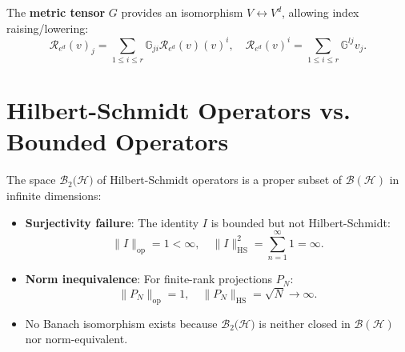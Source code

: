 \documentclass[aps,preprint]{revtex4}
\begin{document}
The \textbf{metric tensor} $G$ provides an isomorphism $V\leftrightarrow
V^{d}$, allowing index raising/lowering: 
\begin{equation*}
\mathcal{R}_{e^{d}}\left( v\right) _{j}=\sum_{1\leq i\leq r}\mathbb{G}_{ji}%
\mathcal{R}_{e^{d}}\left( v\right) \left( v\right) ^{i},\quad \mathcal{R}%
_{e^{d}}\left( v\right) ^{i}=\sum_{1\leq i\leq r}\mathbb{G}^{lj}v_{j}.
\end{equation*}

\section{Hilbert-Schmidt Operators vs. Bounded Operators }

The space $\mathcal{B}_{2}\mathcal{(H})$ of Hilbert-Schmidt operators is a
proper subset of $\mathcal{B}(\mathcal{H})$ in infinite dimensions:

\begin{itemize}
\item \textbf{Surjectivity failure}: The identity $I $ is bounded but not
Hilbert-Schmidt: 
\begin{equation*}
\|I\|_{\text{op}} = 1 < \infty, \quad \|I\|_{\text{HS}}^2 =
\sum_{n=1}^\infty 1 = \infty.
\end{equation*}

\item \textbf{Norm inequivalence}: For finite-rank projections $P_N $: 
\begin{equation*}
\|P_N\|_{\text{op}} = 1, \quad \|P_N\|_{\text{HS}} = \sqrt{N} \to \infty.
\end{equation*}

\item No Banach isomorphism exists because $\mathcal{B}_{2}\mathcal{(H})$ is
neither closed in $\mathcal{B}(\mathcal{H})$ nor norm-equivalent.
\end{itemize}
\end{document}
